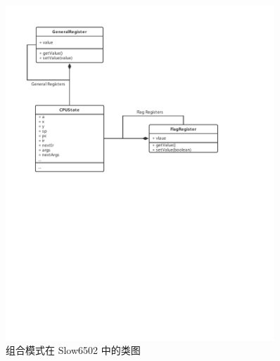 \begin{figure}[htb]
    \centering
    \includegraphics[width=0.9\textwidth]{figures/Composite.pdf}
    \caption{组合模式在 Slow6502 中的类图}
\end{figure}

